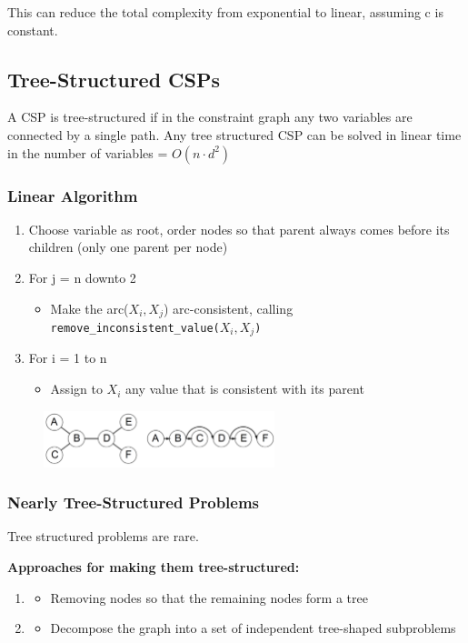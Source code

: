 \documentclass[
../../EiKI_Summary.tex,
]
{subfiles}
\begin{document}
This can reduce the total complexity from exponential to linear, assuming c is constant.

\subsection{Tree-Structured CSPs}
A CSP is tree-structured if in the constraint graph any two variables are connected by a single path. Any tree structured CSP can be solved in linear time in the number of variables = $O(n\cdot d^2)$

\subsubsection{Linear Algorithm}
\begin{enumerate}
    \item Choose variable as root, order nodes so that parent always comes before its children (only one parent per node)
    \item For j = n downto 2
    \begin{itemize}
        \item Make the arc($X_i, X_{j}$) arc-consistent, calling \texttt{remove\_inconsistent\_value($X_i, X_{j}$)}
    \end{itemize}
    \item For i = 1 to n
    \begin{itemize}
        \item Assign to $X_i$ any value that is consistent with its parent
    \end{itemize}
\end{enumerate}

\begin{figure}
    [H]
    \centering
    \includegraphics[width=0.6\textwidth]{Pics/05/LinearAlgorithmTree.png}
\end{figure}

\subsubsection{Nearly Tree-Structured Problems}
Tree structured problems are rare.

\textbf{Approaches for making them tree-structured:}
\begin{enumerate}
    \item {}
    \begin{itemize}
        \item Removing nodes so that the remaining nodes form a tree
    \end{itemize}
    \item {}
    \begin{itemize}
        \item Decompose the graph into a set of independent tree-shaped subproblems
    \end{itemize}
\end{enumerate}
\end{document}
